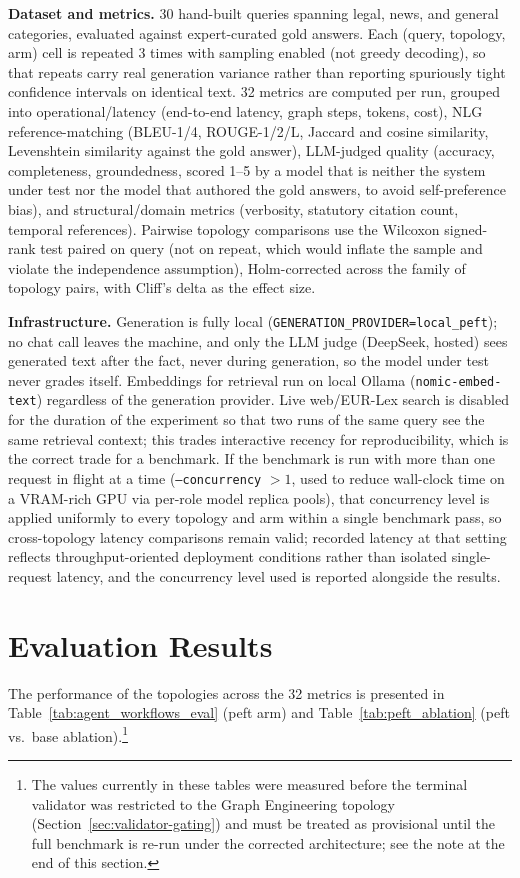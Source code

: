 \documentclass[journal,10pt,compsoc,onecolumn]{IEEEtran}
\begin{document}
\textbf{Dataset and metrics.} 30 hand-built queries spanning legal, news, and general categories, evaluated against expert-curated gold answers. Each (query, topology, arm) cell is repeated 3 times with sampling enabled (not greedy decoding), so that repeats carry real generation variance rather than reporting spuriously tight confidence intervals on identical text. 32 metrics are computed per run, grouped into operational/latency (end-to-end latency, graph steps, tokens, cost), NLG reference-matching (BLEU-1/4, ROUGE-1/2/L, Jaccard and cosine similarity, Levenshtein similarity against the gold answer), LLM-judged quality (accuracy, completeness, groundedness, scored 1--5 by a model that is neither the system under test nor the model that authored the gold answers, to avoid self-preference bias), and structural/domain metrics (verbosity, statutory citation count, temporal references). Pairwise topology comparisons use the Wilcoxon signed-rank test paired on query (not on repeat, which would inflate the sample and violate the independence assumption), Holm-corrected across the family of topology pairs, with Cliff's delta as the effect size.

\textbf{Infrastructure.} Generation is fully local (\texttt{GENERATION\_PROVIDER=local\_peft}); no chat call leaves the machine, and only the LLM judge (DeepSeek, hosted) sees generated text after the fact, never during generation, so the model under test never grades itself. Embeddings for retrieval run on local Ollama (\texttt{nomic-embed-text}) regardless of the generation provider. Live web/EUR-Lex search is disabled for the duration of the experiment so that two runs of the same query see the same retrieval context; this trades interactive recency for reproducibility, which is the correct trade for a benchmark. If the benchmark is run with more than one request in flight at a time (\texttt{--concurrency} $>1$, used to reduce wall-clock time on a VRAM-rich GPU via per-role model replica pools), that concurrency level is applied uniformly to every topology and arm within a single benchmark pass, so cross-topology latency comparisons remain valid; recorded latency at that setting reflects throughput-oriented deployment conditions rather than isolated single-request latency, and the concurrency level used is reported alongside the results.

\section{Evaluation Results}
The performance of the topologies across the 32 metrics is presented in Table~\ref{tab:agent_workflows_eval} (peft arm) and Table~\ref{tab:peft_ablation} (peft vs.\ base ablation).\footnote{The values currently in these tables were measured before the terminal validator was restricted to the Graph Engineering topology (Section~\ref{sec:validator-gating}) and must be treated as provisional until the full benchmark is re-run under the corrected architecture; see the note at the end of this section.}
\end{document}

